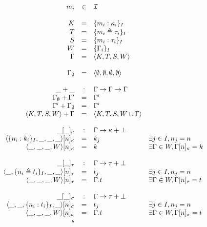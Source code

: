 \documentclass{article}[11pt]
\begin{document}
    \begin{math}
        \begin{array}{rcll}
            m_i & \in & {\cal I} \\
            \\
            K       & =   & \{ m_i : \kappa_i \}_I            \\
            T       & =   & \{ m_i \triangleq \tau_i \}_I     \\
            S       & =   & \{ m_i : \tau_i \}_I              \\
            W       & =   & \{ \Gamma_i \}_I                  \\
            \Gamma  & =   & \langle K, T, S, W \rangle        \\
            \\
            \Gamma_\emptyset & = & \langle \emptyset, \emptyset, \emptyset, \emptyset \rangle \\
            \\
            \_+\_         & : & \Gamma \rightarrow \Gamma \rightarrow \Gamma \\
            \Gamma_\emptyset + \Gamma' & = & \Gamma'    \\
            \Gamma' + \Gamma_\emptyset & = & \Gamma' \\
            \langle K, T, S, W \rangle + \Gamma & =&  \langle K, T, S, W \cup \Gamma \rangle \\
            \\
            \_[\_]_\kappa & : & \Gamma \rightarrow \kappa + \bot \\
            \langle \{n_i:k_i\}_I, \_, \_, \_\rangle[n]_\kappa & =                           & k_j & \exists j \in I, n_j = n \\
            \langle \_, \_, \_, W\rangle[n]_\kappa & = & k & \exists \Gamma \in W, \Gamma[n]_\kappa = k \\
            \\
            \_[\_]_\tau & : & \Gamma \rightarrow \tau + \bot \\
            \langle \_, \{n_i \triangleq t_i\}_I, \_, \_\rangle[n]_\tau & = & t_j & \exists j \in I, n_j = n \\
            \langle \_, \_, \_, W\rangle[n]_\tau & = & \Gamma.t & \exists \Gamma \in W, \Gamma[n]_\tau = t \\
            \\
            \_[\_]_\sigma & : & \Gamma \rightarrow \tau + \bot \\
            \langle \_, \_, \{n_i:t_i\}_I, \_\rangle[n]_\sigma & = & t_j & \exists j \in I, n_j = n \\
            \langle \_, \_, \_, W\rangle[n]_\sigma & = & \Gamma.t & \exists \Gamma \in W, \Gamma[n]_\sigma = t \\s
        \end{array}
    \end{math}
\end{document}
